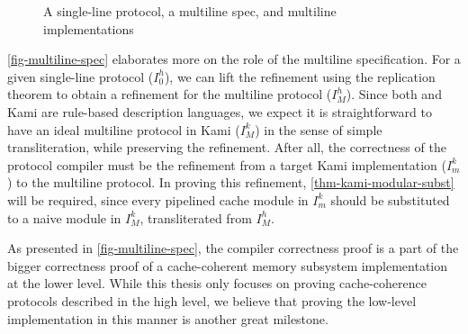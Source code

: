 \begin{figure}[t]
  \centering
  \caption{A single-line protocol, a multiline spec, and multiline implementations}
  \label{fig-multiline-spec}
\end{figure}

\autoref{fig-multiline-spec} elaborates more on the role of the multiline specification.
For a given \hemiola{} single-line protocol ($I^{h}_{0}$), we can lift the refinement using the replication theorem to obtain a refinement for the multiline protocol ($I^{h}_{M}$).
Since both \hemiola{} and Kami are rule-based description languages, we expect it is straightforward to have an ideal multiline protocol in Kami ($I^{k}_{M}$) in the sense of simple transliteration, while preserving the refinement.
After all, the correctness of the protocol compiler must be the refinement from a target Kami implementation ($I^{k}_{m}$) to the multiline protocol.
In proving this refinement, \autoref{thm-kami-modular-subst} will be required, since every pipelined cache module in $I^{k}_{m}$ should be substituted to a naive module in $I^{k}_{M}$, transliterated from $I^{h}_{M}$.

As presented in \autoref{fig-multiline-spec}, the compiler correctness proof is a part of the bigger correctness proof of a cache-coherent memory subsystem implementation at the lower level.
While this thesis only focuses on proving cache-coherence protocols described in the high level, we believe that proving the low-level implementation in this manner is another great milestone.

